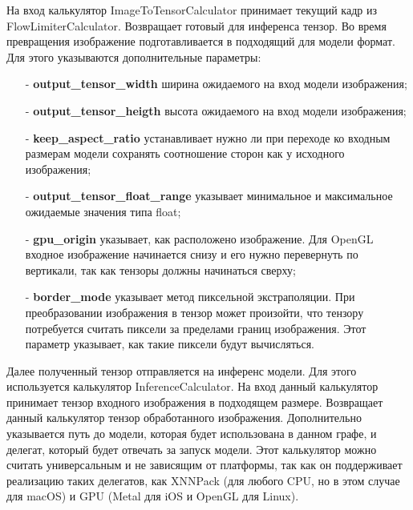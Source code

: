 \documentclass[a4paper,14pt]{extreport}
\begin{document}
        На вход калькулятор ImageToTensorCalculator принимает текущий кадр из FlowLimiterCalculator. Возвращает готовый для инференса тензор. Во время превращения изображение подготавливается в подходящий для модели формат. Для этого указываются дополнительные параметры:
        \begin{itemize}
          \item[-] \textbf{output\_tensor\_width} ширина ожидаемого на вход модели изображения;
          \item[-] \textbf{output\_tensor\_heigth} высота ожидаемого на вход модели изображения;
          \item[-] \textbf{keep\_aspect\_ratio} устанавливает нужно ли при переходе ко входным размерам модели сохранять соотношение сторон как у исходного изображения;
          \item[-] \textbf{output\_tensor\_float\_range} указывает минимальное и максимальное ожидаемые значения типа float;
          \item[-] \textbf{gpu\_origin} указывает, как расположено изображение. Для OpenGL входное изображение начинается снизу и его нужно перевернуть по вертикали, так как тензоры должны начинаться сверху;
          \item[-] \textbf{border\_mode} указывает метод пиксельной экстраполяции. При преобразовании изображения в тензор может произойти, что тензору потребуется считать пиксели за пределами границ изображения. Этот параметр указывает, как такие пиксели будут вычисляться.
        \end{itemize}
        

        Далее полученный тензор отправляется на инференс модели. Для этого используется калькулятор InferenceCalculator. На вход данный калькулятор принимает тензор входного изображения в подходящем размере. Возвращает данный калькулятор тензор обработанного изображения. Дополнительно указывается путь до модели, которая будет использована в данном графе, и делегат, который будет отвечать за запуск модели. Этот калькулятор можно считать универсальным и не зависящим от платформы, так как он поддерживает реализацию таких делегатов, как XNNPack (для любого CPU, но в этом случае для macOS) и GPU (Metal для iOS и OpenGL для Linux).
        
\end{document}
